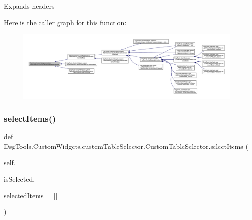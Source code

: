 \begin{DoxyVerb}Expands headers
\end{DoxyVerb}
 Here is the caller graph for this function\+:
\nopagebreak
\begin{figure}[H]
\begin{center}
\leavevmode
\includegraphics[width=350pt]{class_dsg_tools_1_1_custom_widgets_1_1custom_table_selector_1_1_custom_table_selector_af85287115718bf9b8747eb7385d70a7a_icgraph}
\end{center}
\end{figure}
\mbox{\label{class_dsg_tools_1_1_custom_widgets_1_1custom_table_selector_1_1_custom_table_selector_a680a7f73d6d12bb822954f376f7c16e5}} 
\subsubsection{\texorpdfstring{select\+Items()}{selectItems()}}
{\footnotesize\ttfamily def Dsg\+Tools.\+Custom\+Widgets.\+custom\+Table\+Selector.\+Custom\+Table\+Selector.\+select\+Items (\begin{DoxyParamCaption}\item[{}]{self,  }\item[{}]{is\+Selected,  }\item[{}]{selected\+Items = {\ttfamily \mbox{[}\mbox{]}} }\end{DoxyParamCaption})}

